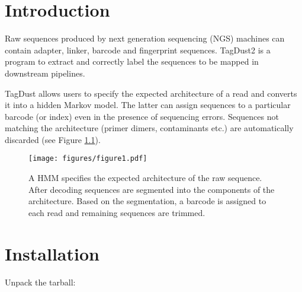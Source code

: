 \documentclass[11pt,a4paper,oneside]{book}
\begin{document}
\tableofcontents
\mainmatter

\chapter{Introduction}


Raw sequences produced by next generation sequencing (NGS) machines can contain adapter, linker, barcode and fingerprint sequences. TagDust2 is a program to extract and correctly label the sequences to be mapped in downstream pipelines.

TagDust allows users to specify the expected architecture of a read and converts it into a hidden Markov model. The latter can assign sequences to a particular barcode (or index) even in the presence of sequencing errors. Sequences not matching the architecture (primer dimers, contaminants etc.) are automatically discarded (see Figure \ref{figure1}).



\begin{figure}[h]


\texttt{[image: figures/figure1.pdf]}

\caption{A HMM specifies the expected architecture of the raw sequence. After decoding sequences are segmented into the components of the architecture. Based on the segmentation, a barcode is assigned to each read and remaining sequences are trimmed.}
\label{figure1}
\end{figure}



\newpage

\chapter{Installation}


Unpack the tarball:
\end{document}
